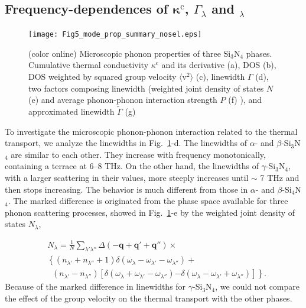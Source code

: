 \documentclass[twocolumn,amsmath,amssymb,a4paper,prb,superscriptaddress,floatfix]{revtex4-1}
\begin{document}
\subsection{Frequency-dependences of $\boldsymbol{\kappa}^\text{c}$, $\Gamma_\lambda$ and $_\lambda$}
\begin{figure}[ht]
 \begin{center}
  \texttt{[image: Fig5\_mode\_prop\_summary\_nosel.eps]}
  \caption{(color online) Microscopic phonon properties of three Si$_3$N$_4$
	  phases. Cumulative thermal conductivity $\kappa^\text{c}$ and its derivative
	  (a), DOS (b), DOS weighted by squared group velocity
	  $\langle\text{v}^2\rangle$ (c), linewidth $\Gamma$ (d), two factors
	  composing linewidth (weighted joint density of states $N$ (e) and average phonon-phonon
	  interaction strength $P$ (f) ), and approximated linewidth
	  $\tilde{\Gamma}$ (g) 
  \label{fig:Fig5_338_rev} }
 \end{center}
\end{figure}
To investigate the microscopic phonon-phonon interaction related to the thermal
transport, we analyze the linewidths in Fig.~\ref{fig:Fig5_338_rev}-d.
The linewidths of $\alpha$- and $\beta$-Si$_3$N$_4$ are similar to each other.
They increase with frequency monotonically, containing a terrace at 6--8 THz.
On the other hand, the linewidths of $\gamma$-Si$_3$N$_4$, with a larger
scattering in their values, more steeply increases until $\sim$ 7 THz and then
stops increasing.
The behavior is much different from those in $\alpha$- and $\beta$-Si$_4$N$_4$.
The marked difference is originated from the phase space available for three
phonon scattering processes, showed in Fig.~\ref{fig:Fig5_338_rev}-e by the
weighted joint density of states $N_\lambda$,

\begin{align}
 \label{eq:wjdos}
 &N_\lambda = \frac{1}{N}
  \sum_{\lambda' \lambda''}
  \Delta(-\mathbf{q}+\mathbf{q}'+\mathbf{q}'') \times \nonumber \\ 
 &\left\{ (n_{\lambda'} + n_{\lambda''}+1) 
   \delta(\omega_\lambda-\omega_{\lambda'}-\omega_{\lambda''}) \right.
   + \nonumber \\ 
 &\;\;(n_{\lambda'}-n_{\lambda''})
  \left[\delta(\omega_\lambda +\omega_{\lambda'}-\omega_{\lambda''})
 \right. 
 \left. -\left. \delta(\omega_\lambda - \omega_{\lambda'}+\omega_{\lambda''})
 \right]\right\}.
\end{align}
Because of the marked difference in linewidths for $\gamma$-Si$_3$N$_4$, we
could not compare the effect of the group velocity on the thermal transport with
the other phases.
\end{document}
